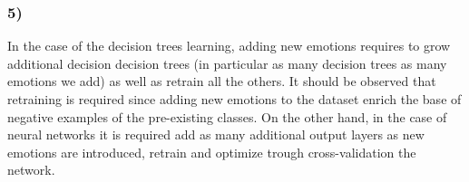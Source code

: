 \documentclass{article}
\begin{document}
\subsubsection*{5)}
In the case of the decision trees learning, adding new emotions requires to grow additional decision decision trees (in particular as many decision trees as many emotions we add) as well as retrain all the others. It should be observed that retraining is required since adding new emotions to the dataset enrich the base of negative examples of the pre-existing classes. On the other hand, in the case of neural networks it is required add as many additional output layers as new emotions are introduced, retrain  and optimize trough cross-validation the network.

%
%
\end{document}
